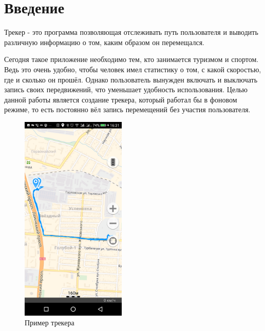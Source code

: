 \documentclass[a4paper,12pt]{article}
\begin{document}
\pagebreak

\newpage

\tableofcontents



\pagebreak



\section*{Введение}

Трекер - это программа позволяющая отслеживать путь пользователя и выводить
различную информацию о том, каким образом он перемещался.

Сегодня такое приложение необходимо тем, кто занимается туризмом и спортом.
Ведь это очень удобно, чтобы человек имел статистику о том, с какой скоростью,
где и сколько он прошёл. Однако пользователь вынужден включать и выключать 
запись своих передвижений, что уменьшает удобность использования.
Целью данной работы является создание трекера, который работал бы в фоновом режиме,
то есть постоянно вёл запись перемещений без участия пользователя.

\begin{figure}[H]
	\centering
	\includegraphics[height=10cm]{images/example.png}
	\caption{Пример трекера}
	\label{fig:card}
\end{figure}
\end{document}
